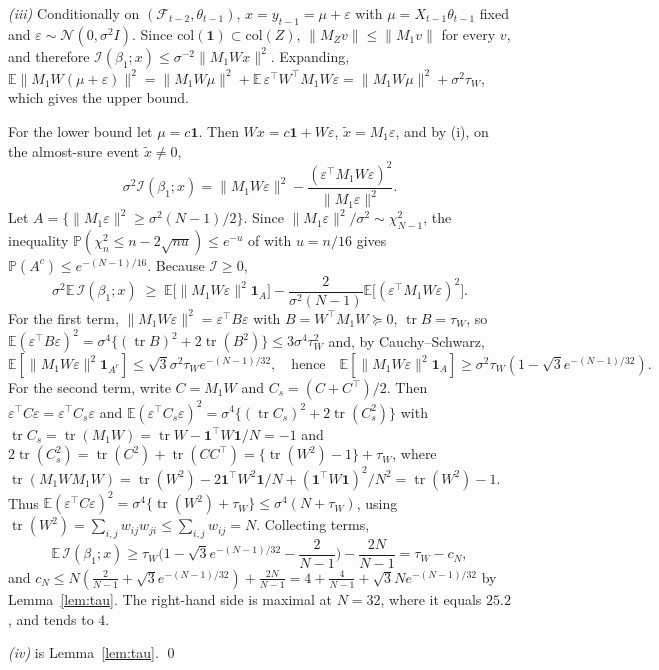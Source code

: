 \documentclass[12pt]{article}
\theoremstyle{plain}
\theoremstyle{definition}
\theoremstyle{remark}
\newcommand{\E}{\mathbb{E}}
\newcommand{\Prob}{\mathbb{P}}
\newcommand{\tr}{\operatorname{tr}}
\newcommand{\one}{\mathbf{1}}
\newcommand{\calF}{\mathcal{F}}
\newcommand{\calI}{\mathcal{I}}
\newcommand{\calN}{\mathcal{N}}
\newcommand{\tauW}{\tau_W}
\newcommand{\T}{^{\top}}
\begin{document}
\emph{(iii)} Conditionally on $(\calF_{t-2},\theta_{t-1})$, $x=y_{t-1}=\mu+\varepsilon$ with $\mu=X_{t-1}\theta_{t-1}$ fixed and $\varepsilon\sim\calN(0,\sigma^2I)$. Since $\mathrm{col}(\one)\subset\mathrm{col}(Z)$, $\|M_Zv\|\le\|M_1v\|$ for every $v$, and therefore $\calI(\beta_1;x)\le\sigma^{-2}\|M_1Wx\|^2$. Expanding, $\E\|M_1W(\mu+\varepsilon)\|^2=\|M_1W\mu\|^2+\E\,\varepsilon\T W\T M_1W\varepsilon=\|M_1W\mu\|^2+\sigma^2\tauW$, which gives the upper bound.

For the lower bound let $\mu=c\one$. Then $Wx=c\one+W\varepsilon$, $\tilde x=M_1\varepsilon$, and by (i), on the almost-sure event $\tilde x\ne0$,
\[
\sigma^2\calI(\beta_1;x)=\|M_1W\varepsilon\|^2-\frac{(\varepsilon\T M_1W\varepsilon)^2}{\|M_1\varepsilon\|^2}.
\]
Let $A=\{\|M_1\varepsilon\|^2\ge\sigma^2(N-1)/2\}$. Since $\|M_1\varepsilon\|^2/\sigma^2\sim\chi^2_{N-1}$, the inequality $\Prob(\chi^2_n\le n-2\sqrt{nu})\le e^{-u}$ of \citet{laurent2000adaptive} with $u=n/16$ gives $\Prob(A^c)\le e^{-(N-1)/16}$. Because $\calI\ge0$,
\[
\sigma^2\E\,\calI(\beta_1;x)\;\ge\;\E\big[\|M_1W\varepsilon\|^2\mathbf 1_A\big]-\frac{2}{\sigma^2(N-1)}\E\big[(\varepsilon\T M_1W\varepsilon)^2\big].
\]
For the first term, $\|M_1W\varepsilon\|^2=\varepsilon\T B\varepsilon$ with $B=W\T M_1W\succeq0$, $\tr B=\tauW$, so $\E(\varepsilon\T B\varepsilon)^2=\sigma^4\{(\tr B)^2+2\tr(B^2)\}\le3\sigma^4\tauW^2$ and, by Cauchy--Schwarz,
\[
\E[\|M_1W\varepsilon\|^2\mathbf 1_{A^c}]\le\sqrt3\sigma^2\tauW e^{-(N-1)/32},\quad\text{hence}\quad\E[\|M_1W\varepsilon\|^2\mathbf 1_A]\ge\sigma^2\tauW(1-\sqrt3e^{-(N-1)/32}).
\]
For the second term, write $C=M_1W$ and $C_s=(C+C\T)/2$. Then $\varepsilon\T C\varepsilon=\varepsilon\T C_s\varepsilon$ and $\E(\varepsilon\T C_s\varepsilon)^2=\sigma^4\{(\tr C_s)^2+2\tr(C_s^2)\}$ with $\tr C_s=\tr(M_1W)=\tr W-\one\T W\one/N=-1$ and $2\tr(C_s^2)=\tr(C^2)+\tr(CC\T)=\{\tr(W^2)-1\}+\tauW$, where $\tr(M_1WM_1W)=\tr(W^2)-2\one\T W^2\one/N+(\one\T W\one)^2/N^2=\tr(W^2)-1$. Thus $\E(\varepsilon\T C\varepsilon)^2=\sigma^4\{\tr(W^2)+\tauW\}\le\sigma^4(N+\tauW)$, using $\tr(W^2)=\sum_{i,j}w_{ij}w_{ji}\le\sum_{i,j}w_{ij}=N$. Collecting terms,
\[
\E\,\calI(\beta_1;x)\ge\tauW\Big(1-\sqrt3e^{-(N-1)/32}-\frac{2}{N-1}\Big)-\frac{2N}{N-1}=\tauW-c_N ,
\]
and $c_N\le N(\tfrac{2}{N-1}+\sqrt3e^{-(N-1)/32})+\tfrac{2N}{N-1}=4+\tfrac{4}{N-1}+\sqrt3Ne^{-(N-1)/32}$ by Lemma~\ref{lem:tau}. The right-hand side is maximal at $N=32$, where it equals $25.2$, and tends to $4$.

\emph{(iv)} is Lemma~\ref{lem:tau}. \qed
\end{document}
